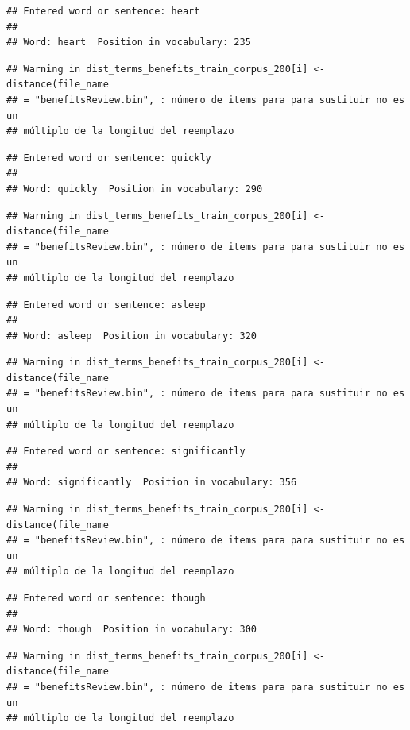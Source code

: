 \documentclass[spanish,]{article}
\begin{document}
\begin{verbatim}
## Entered word or sentence: heart
## 
## Word: heart  Position in vocabulary: 235
\end{verbatim}

\begin{verbatim}
## Warning in dist_terms_benefits_train_corpus_200[i] <- distance(file_name
## = "benefitsReview.bin", : número de items para para sustituir no es un
## múltiplo de la longitud del reemplazo
\end{verbatim}

\begin{verbatim}
## Entered word or sentence: quickly
## 
## Word: quickly  Position in vocabulary: 290
\end{verbatim}

\begin{verbatim}
## Warning in dist_terms_benefits_train_corpus_200[i] <- distance(file_name
## = "benefitsReview.bin", : número de items para para sustituir no es un
## múltiplo de la longitud del reemplazo
\end{verbatim}

\begin{verbatim}
## Entered word or sentence: asleep
## 
## Word: asleep  Position in vocabulary: 320
\end{verbatim}

\begin{verbatim}
## Warning in dist_terms_benefits_train_corpus_200[i] <- distance(file_name
## = "benefitsReview.bin", : número de items para para sustituir no es un
## múltiplo de la longitud del reemplazo
\end{verbatim}

\begin{verbatim}
## Entered word or sentence: significantly
## 
## Word: significantly  Position in vocabulary: 356
\end{verbatim}

\begin{verbatim}
## Warning in dist_terms_benefits_train_corpus_200[i] <- distance(file_name
## = "benefitsReview.bin", : número de items para para sustituir no es un
## múltiplo de la longitud del reemplazo
\end{verbatim}

\begin{verbatim}
## Entered word or sentence: though
## 
## Word: though  Position in vocabulary: 300
\end{verbatim}

\begin{verbatim}
## Warning in dist_terms_benefits_train_corpus_200[i] <- distance(file_name
## = "benefitsReview.bin", : número de items para para sustituir no es un
## múltiplo de la longitud del reemplazo
\end{verbatim}
\end{document}
